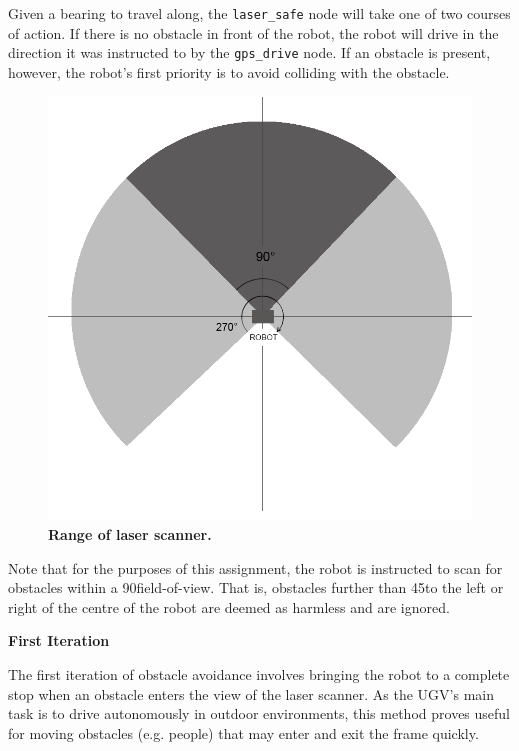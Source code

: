 \documentclass[titlepage,12pt,a4paper]{article}
\begin{document}
Given a bearing to travel along, the \verb|laser_safe| node will take one of two courses of action. If there is no obstacle in front of the robot, the robot will drive in the direction it was instructed to by the \verb|gps_drive| node. If an obstacle is present, however, the robot's first priority is to avoid colliding with the obstacle. 

\begin{figure}[h]
	\centering
	\includegraphics[scale=0.34]{figures/laser.png}
	\caption{\textbf{Range of laser scanner.}}
\end{figure}

Note that for the purposes of this assignment, the robot is instructed to scan for obstacles within a 90\degree field-of-view. That is, obstacles further than 45\degree to the left or right of the centre of the robot are deemed as harmless and are ignored.

\textbf{First Iteration}

The first iteration of obstacle avoidance involves bringing the robot to a complete stop when an obstacle enters the view of the laser scanner. As the UGV's main task is to drive autonomously in outdoor environments, this method proves useful for moving obstacles (e.g. people) that may enter and exit the frame quickly. \\
\end{document}
